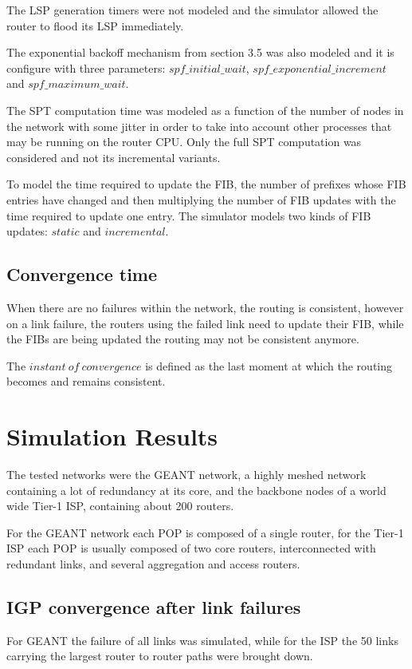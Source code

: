 \documentclass[a4paper, 11pt]{article}
\begin{document}
The LSP generation timers were not modeled and the simulator allowed the router to flood its LSP immediately.

The exponential backoff mechanism from section 3.5 was also modeled and it is configure with three parameters: $spf\_initial\_wait$, $spf\_exponential\_increment$ and $spf\_maximum\_wait$.

The SPT computation time was modeled as a function of the number of nodes in the network with some jitter in order to take into account other processes that may be running on the router CPU.
Only the full SPT computation was considered and not its incremental variants.

To model the time required to update the FIB, 
the number of prefixes whose FIB entries have changed and then multiplying the number of FIB updates with the time required to update one entry.
The simulator models two kinds of FIB updates: $static$ and $incremental$.

\subsection{Convergence time}
When there are no failures within the network, the routing is consistent, however on a link failure, the routers using the failed link need to update their FIB, while the FIBs are being updated the routing may not be consistent anymore.

The $instant\ of\ convergence$ is defined as the last moment at which the routing becomes and remains consistent.

\section{Simulation Results}
The tested networks were the GEANT network, a highly meshed network containing a lot of redundancy at its core, 
and the backbone nodes of a world wide Tier-1 ISP, containing about 200 routers.

For the GEANT network each POP is composed of a single router, for the Tier-1 ISP each POP is usually composed of two core routers, interconnected with redundant links, and several aggregation and access routers.

\subsection{IGP convergence after link failures}
For GEANT the failure of all links was simulated, 
while for the ISP the 50 links carrying the largest router to router paths were brought down.
\end{document}
